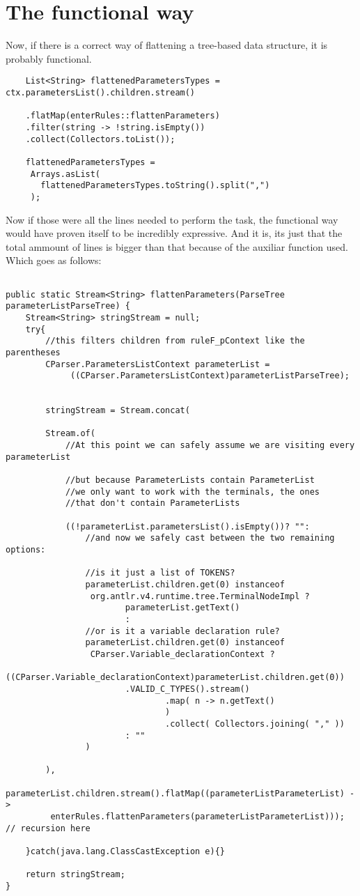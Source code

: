 \documentclass[twocolumn,10ptr]{article}
\begin{document}
	\section{The functional way}
	Now, if there is a correct way of flattening a tree-based data structure, it is probably functional.\\
	
	\begin{lstlisting}
	List<String> flattenedParametersTypes = ctx.parametersList().children.stream()
	
	.flatMap(enterRules::flattenParameters)
	.filter(string -> !string.isEmpty())
	.collect(Collectors.toList());
	
	flattenedParametersTypes =
	 Arrays.asList(
	   flattenedParametersTypes.toString().split(",")
	 ); 
	\end{lstlisting}
	
	
	Now if those were all the lines needed to perform the task, the functional way would have proven itself to be incredibly expressive. And it is, its just that the total ammount of lines is bigger than that because of the auxiliar function used. Which goes as follows:
	
		\begin{lstlisting}

public static Stream<String> flattenParameters(ParseTree parameterListParseTree) {
	Stream<String> stringStream = null;
	try{
		//this filters children from ruleF_pContext like the parentheses
		CParser.ParametersListContext parameterList =
			 ((CParser.ParametersListContext)parameterListParseTree);
		
		
		stringStream = Stream.concat(
		
		Stream.of(
			//At this point we can safely assume we are visiting every parameterList
			
			//but because ParameterLists contain ParameterList
			//we only want to work with the terminals, the ones 
			//that don't contain ParameterLists  
			
			((!parameterList.parametersList().isEmpty())? "":
				//and now we safely cast between the two remaining options:
				
				//is it just a list of TOKENS? 
				parameterList.children.get(0) instanceof
				 org.antlr.v4.runtime.tree.TerminalNodeImpl ? 
						parameterList.getText() 
						: 
				//or is it a variable declaration rule? 
				parameterList.children.get(0) instanceof
				 CParser.Variable_declarationContext ?
						((CParser.Variable_declarationContext)parameterList.children.get(0))
						.VALID_C_TYPES().stream()
								.map( n -> n.getText()                                                    
								)
								.collect( Collectors.joining( "," )) 
						: ""
				)
		
		), 
		parameterList.children.stream().flatMap((parameterListParameterList) ->
		 enterRules.flattenParameters(parameterListParameterList))); // recursion here
		
	}catch(java.lang.ClassCastException e){}
	
	return stringStream;
}
	\end{lstlisting}
	
\end{document}
